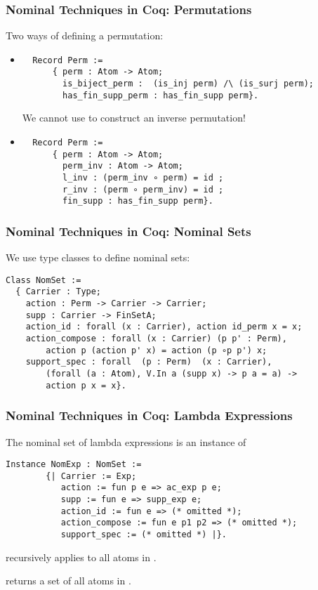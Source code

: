 \documentclass[10pt]{beamer}
\begin{document}
\begin{frame}[fragile]
  \frametitle{Nominal Techniques in Coq: Permutations}
  Two ways of defining a permutation:
  \begin{itemize}
    \item
    \begin{lstlisting}
  Record Perm :=
      { perm : Atom -> Atom;
        is_biject_perm :  (is_inj perm) /\ (is_surj perm);
        has_fin_supp_perm : has_fin_supp perm}.
    \end{lstlisting}
    \pause
    We cannot use  to construct an inverse permutation!
    \pause
  \item
  \begin{lstlisting}
  Record Perm :=
      { perm : Atom -> Atom;
        perm_inv : Atom -> Atom;
        l_inv : (perm_inv ∘ perm) = id ;
        r_inv : (perm ∘ perm_inv) = id ;
        fin_supp : has_fin_supp perm}.
  \end{lstlisting}
  \end{itemize}
\end{frame}

\begin{frame}[fragile]
  \frametitle{Nominal Techniques in Coq: Nominal Sets}
  We use type classes to define nominal sets:
    \begin{lstlisting}
Class NomSet :=
  { Carrier : Type;
    action : Perm -> Carrier -> Carrier;
    supp : Carrier -> FinSetA;
    action_id : forall (x : Carrier), action id_perm x = x;
    action_compose : forall (x : Carrier) (p p' : Perm),
        action p (action p' x) = action (p ∘p p') x;
    support_spec : forall  (p : Perm)  (x : Carrier),
        (forall (a : Atom), V.In a (supp x) -> p a = a) ->
        action p x = x}.
    \end{lstlisting}
\end{frame}

\begin{frame}[fragile]
  \frametitle{Nominal Techniques in Coq: Lambda Expressions}
  The nominal set of lambda expressions is an instance of 
    \begin{lstlisting}
Instance NomExp : NomSet :=
        {| Carrier := Exp;
           action := fun p e => ac_exp p e;
           supp := fun e => supp_exp e;
           action_id := fun e => (* omitted *);
           action_compose := fun e p1 p2 => (* omitted *);
           support_spec := (* omitted *) |}.
    \end{lstlisting}

 recursively applies  to all atoms in .

 returns a set of all atoms in .
\end{frame}
\end{document}
